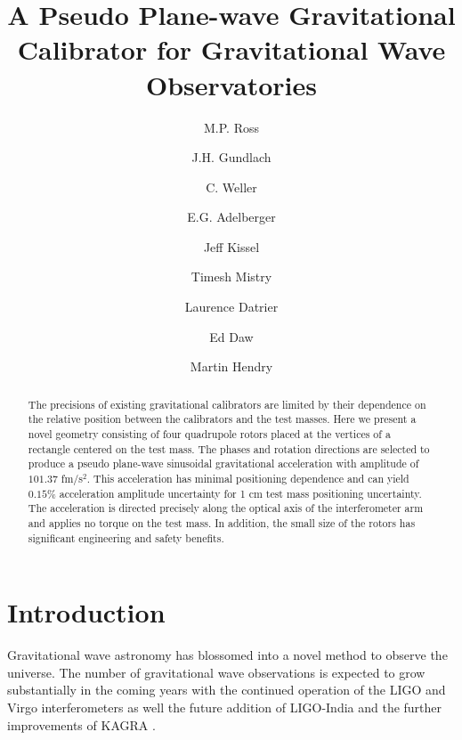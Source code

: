 \documentclass[superscriptaddress, twocolumn, prd]{revtex4-1}
\begin{document}
\title{A Pseudo Plane-wave Gravitational Calibrator for Gravitational Wave Observatories}

\author{M.P. Ross}
\author{J.H. Gundlach}
\author{C. Weller}
\author{E.G. Adelberger}
\author{Jeff Kissel}
\author{Timesh Mistry}
\author{Laurence Datrier}
\author{Ed Daw}
\author{Martin Hendry}



\begin{abstract}

 The precisions of existing gravitational calibrators are limited by their dependence on the relative position between the calibrators and the test masses. Here we present a novel geometry consisting of four quadrupole rotors placed at the vertices of a rectangle centered on the test mass. The phases and rotation directions are selected to produce a pseudo plane-wave  sinusoidal gravitational acceleration with amplitude of $101.37$ fm/s$^2$. This acceleration has minimal positioning dependence and can yield $0.15 \%$ acceleration amplitude uncertainty for 1 cm test mass positioning uncertainty. The acceleration is directed precisely along the optical axis of the interferometer arm and applies no torque on the test mass. In addition, the small size of the rotors has significant engineering and safety benefits.

\end{abstract}

\maketitle

\section{Introduction}

Gravitational wave astronomy has blossomed into a novel method to observe the universe. The number of gravitational wave observations is expected to grow substantially in the coming years with the continued operation of the LIGO \cite{aLIGO} and Virgo \cite{virgo} interferometers as well the future addition of LIGO-India \cite{ligo-india} and the further improvements of KAGRA \cite{kagra}. 
\end{document}
